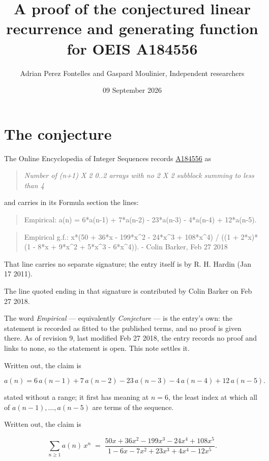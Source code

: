 \documentclass[11pt]{article}
\title{A proof of the conjectured linear recurrence and generating function for OEIS A184556}
\author{Adrian Perez Fontelles and Gaspard Moulinier, Independent researchers}
\date{09 September 2026}
\theoremstyle{definition}
\begin{document}
\maketitle
\section{The conjecture}

The Online Encyclopedia of Integer Sequences records \href{https://oeis.org/A184556}{A184556} as

\begin{quote}\itshape Number of (n+1) X 2 0..2 arrays with no 2 X 2 subblock summing to less than 4\end{quote}

and carries in its Formula section the lines:

\begin{quote}\ttfamily Empirical: a(n) = 6*a(n-1) + 7*a(n-2) - 23*a(n-3) - 4*a(n-4) + 12*a(n-5).\end{quote}

\begin{quote}\ttfamily Empirical g.f.: x*(50 + 36*x - 199*x\textasciicircum{}2 - 24*x\textasciicircum{}3 + 108*x\textasciicircum{}4) / ((1 + 2*x)*(1 - 8*x + 9*x\textasciicircum{}2 + 5*x\textasciicircum{}3 - 6*x\textasciicircum{}4)). - Colin Barker, Feb 27 2018\end{quote}

That line carries no separate signature; the entry itself is by R. H. Hardin (Jan 17 2011).

The line quoted ending in that signature is contributed by Colin Barker on Feb 27 2018.

The word {\itshape Empirical} --- equivalently {\itshape Conjecture} --- is the entry's own: the statement is recorded as fitted to the published terms, and no proof is given there. As of revision 9, last modified Feb 27 2018, the entry records no proof and links to none, so the statement is open. This note settles it.

Written out, the claim is

\[a(n) = 6\,a(n-1) + 7\,a(n-2) - 23\,a(n-3) - 4\,a(n-4) + 12\,a(n-5).\]

stated without a range; it first has meaning at $n = 6$, the least index at which all of $a(n-1),\dots,a(n-5)$ are terms of the sequence.

Written out, the claim is

\[\sum_{n \ge 1} a(n)\,x^n \;=\; \frac{50x + 36x^{2} - 199x^{3} - 24x^{4} + 108x^{5}}{1 - 6x - 7x^{2} + 23x^{3} + 4x^{4} - 12x^{5}}.\]
\end{document}
